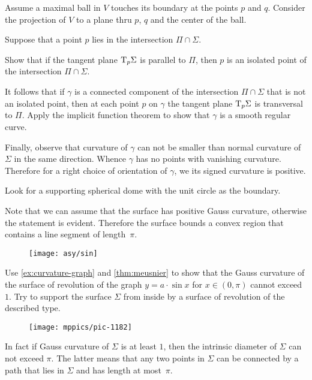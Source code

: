 Assume a maximal ball in $V$ touches its boundary at the points $p$ and $q$.
Consider the projection of $V$ to a plane thru $p$, $q$ and the center of the ball. 

Suppose that a point $p$ lies in the intersection $\Pi\cap\Sigma$.

Show that if the tangent plane $\mathrm{T}_p\Sigma$ is parallel to $\Pi$,
then $p$ is an isolated point of the intersection $\Pi\cap\Sigma$.

It follows that if $\gamma$ is a connected component of the intersection $\Pi\cap\Sigma$ that is not an isolated point,
then at each point $p$ on $\gamma$ the tangent plane $\mathrm{T}_p\Sigma$ is transversal to $\Pi$.
Apply the implicit function theorem to show that $\gamma$ is a smooth regular curve.

Finally, observe that curvature of $\gamma$ can not be smaller than normal curvature of $\Sigma$ in the same direction.
Whence $\gamma$ has no points with vanishing curvature.
Therefore for a right choice of orientation of $\gamma$, we its signed curvature is positive.

Look for a supporting spherical dome with the unit circle as the boundary.

Note that we can assume that the surface has positive Gauss curvature, otherwise the statement is evident.
Therefore the surface bounds a convex region that contains a line segment of length~$\pi$.

\begin{figure}[h!]
\vskip-0mm
\centering
\texttt{[image: asy/sin]}
\vskip-0mm
\end{figure}

Use \ref{ex:curvature-graph} and \ref{thm:meusnier} to show that the Gauss curvature of the surface of revolution of the graph $y=a\cdot \sin x$ for $x\in(0,\pi)$ cannot exceed $1$.
Try to support the surface $\Sigma$ from inside by a surface of revolution of the described type. 

\begin{wrapfigure}[16]{r}{29 mm}
\vskip-6mm
\centering
\texttt{[image: mppics/pic-1182]}
\vskip-0mm
\end{wrapfigure}

In fact if Gauss curvature of $\Sigma$ is at least $1$,
then
the intrinsic diameter of $\Sigma$ can not exceed $\pi$.
The latter means that any two points in $\Sigma$ can be connected by a path that lies in $\Sigma$ and has length at most~$\pi$.


